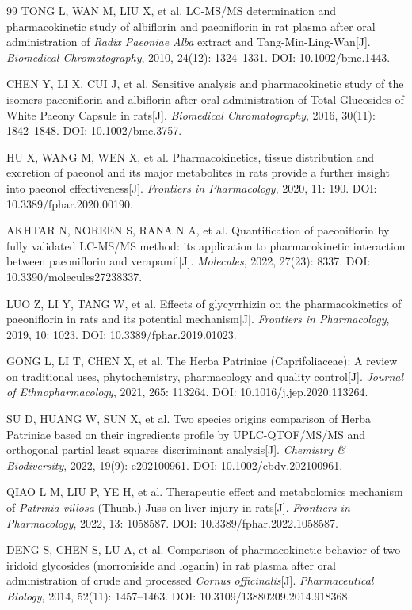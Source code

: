 \documentclass[12pt,a4paper,UTF8,scheme=chinese]{ctexart}
\begin{document}
\begin{thebibliography}{99}
TONG L, WAN M, LIU X, et al. LC-MS/MS determination and pharmacokinetic study of albiflorin and paeoniflorin in rat plasma after oral administration of \textit{Radix Paeoniae Alba} extract and Tang-Min-Ling-Wan[J]. \textit{Biomedical Chromatography}, 2010, 24(12): 1324--1331. DOI: 10.1002/bmc.1443.

CHEN Y, LI X, CUI J, et al. Sensitive analysis and pharmacokinetic study of the isomers paeoniflorin and albiflorin after oral administration of Total Glucosides of White Paeony Capsule in rats[J]. \textit{Biomedical Chromatography}, 2016, 30(11): 1842--1848. DOI: 10.1002/bmc.3757.

HU X, WANG M, WEN X, et al. Pharmacokinetics, tissue distribution and excretion of paeonol and its major metabolites in rats provide a further insight into paeonol effectiveness[J]. \textit{Frontiers in Pharmacology}, 2020, 11: 190. DOI: 10.3389/fphar.2020.00190.

AKHTAR N, NOREEN S, RANA N A, et al. Quantification of paeoniflorin by fully validated LC-MS/MS method: its application to pharmacokinetic interaction between paeoniflorin and verapamil[J]. \textit{Molecules}, 2022, 27(23): 8337. DOI: 10.3390/molecules27238337.

LUO Z, LI Y, TANG W, et al. Effects of glycyrrhizin on the pharmacokinetics of paeoniflorin in rats and its potential mechanism[J]. \textit{Frontiers in Pharmacology}, 2019, 10: 1023. DOI: 10.3389/fphar.2019.01023.

GONG L, LI T, CHEN X, et al. The Herba Patriniae (Caprifoliaceae): A review on traditional uses, phytochemistry, pharmacology and quality control[J]. \textit{Journal of Ethnopharmacology}, 2021, 265: 113264. DOI: 10.1016/j.jep.2020.113264.

SU D, HUANG W, SUN X, et al. Two species origins comparison of Herba Patriniae based on their ingredients profile by UPLC-QTOF/MS/MS and orthogonal partial least squares discriminant analysis[J]. \textit{Chemistry \& Biodiversity}, 2022, 19(9): e202100961. DOI: 10.1002/cbdv.202100961.

QIAO L M, LIU P, YE H, et al. Therapeutic effect and metabolomics mechanism of \textit{Patrinia villosa} (Thunb.) Juss on liver injury in rats[J]. \textit{Frontiers in Pharmacology}, 2022, 13: 1058587. DOI: 10.3389/fphar.2022.1058587.

DENG S, CHEN S, LU A, et al. Comparison of pharmacokinetic behavior of two iridoid glycosides (morroniside and loganin) in rat plasma after oral administration of crude and processed \textit{Cornus officinalis}[J]. \textit{Pharmaceutical Biology}, 2014, 52(11): 1457--1463. DOI: 10.3109/13880209.2014.918368.

\end{thebibliography}
\endgroup
\end{document}
